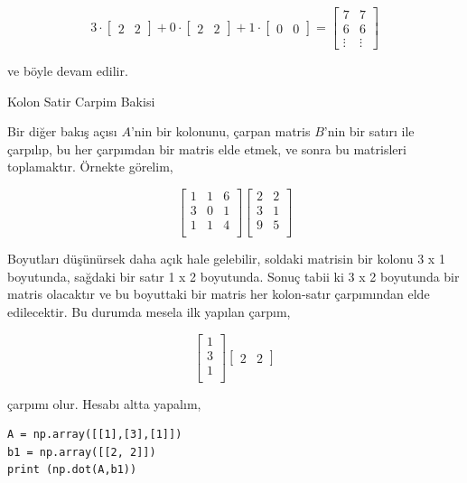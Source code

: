 \documentclass[12pt,fleqn]{article}\usepackage{../../common}
\begin{document}
$$ 
3 \cdot
\left[\begin{array}{cc}
2 & 2
\end{array}\right] +
0 \cdot
\left[\begin{array}{cc}
2 & 2
\end{array}\right] + 
1 \cdot
\left[\begin{array}{cc}
0 & 0
\end{array}\right] 
=
\left[\begin{array}{cc}
7 & 7 \\
6 & 6 \\
\vdots & \vdots
\end{array}\right] 
$$

ve böyle devam edilir.

Kolon Satir Carpim Bakisi

Bir diğer bakış açısı $A$'nin bir kolonunu, çarpan matris $B$'nin bir satırı ile
çarpılıp, bu her çarpımdan bir matris elde etmek, ve sonra bu matrisleri
toplamaktır. Örnekte görelim,

$$
\left[\begin{array}{ccc}
1 & 1 & 6 \\
3 & 0 & 1 \\
1 & 1 & 4 \\
\end{array}\right]
\left[\begin{array}{ccc}
2 & 2  \\
3 & 1  \\
9 & 5  \\
\end{array}\right]
$$

Boyutları düşünürsek daha açık hale gelebilir, soldaki matrisin bir kolonu 3 x 1
boyutunda, sağdaki bir satır 1 x 2 boyutunda. Sonuç tabii ki 3 x 2 boyutunda bir
matris olacaktır ve bu boyuttaki bir matris her kolon-satır çarpımından elde
edilecektir. Bu durumda mesela ilk yapılan çarpım,

$$
\left[\begin{array}{ccc}
1  \\
3  \\
1  \\
\end{array}\right]
\left[\begin{array}{ccc}
2 & 2 
\end{array}\right]
$$

çarpımı olur. Hesabı altta yapalım,

\begin{verbatim}
A = np.array([[1],[3],[1]])
b1 = np.array([[2, 2]])
print (np.dot(A,b1))
\end{verbatim}
\end{document}
